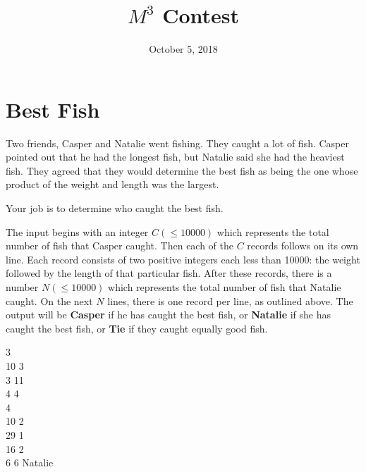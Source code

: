 \documentclass{contest-set}
\title{$M^3$ Contest}
\date{October 5, 2018}
\begin{document}
\maketitle

\section{Best Fish}
Two friends, Casper and Natalie went fishing. They caught a lot of fish. Casper pointed out that he had the longest fish, but Natalie said she had the heaviest fish. They agreed that they would determine the best fish as being the one whose product of the weight and length was the largest.

Your job is to determine who caught the best fish.

The input begins with an integer $C (\leq10000)$ which represents the total number of fish that Casper caught. Then each of the $C$ records follows on its own line. Each record consists of two positive integers each less than 10000: the weight followed by the length of that particular fish. After these records, there is a number $N (\leq10000)$ which represents the total number of fish that Natalie caught.
On the next $N$ lines, there is one record per line, as outlined above.
\outputformat
The output will be \textbf{Casper} if he has caught the best fish, or  \textbf{Natalie} if she has caught the best fish, or  \textbf{Tie} if they caught equally good fish.

\pushnewpage

\addsample
{
3\\
10 3\\
3 11\\
4 4\\
4\\
10 2\\
29 1\\
16 2\\
6 6
}
{
Natalie
}

\newpage
\end{document}
